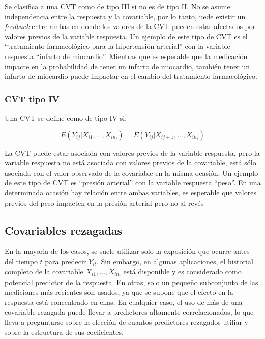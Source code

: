 \documentclass[spanish]{article}
\numberwithin{figure}{subsection}
\numberwithin{equation}{subsection}
\numberwithin{table}{subsection}
\def\xseqn{$X_{i1}, ..., X_{in_i}$}
\begin{document}
Se clasifica a una CVT como de tipo III si no es de tipo II. No se asume independencia entre la respuesta y la covariable,
por lo tanto, uede existir un \textit{feedback} entre ambas en donde los valores de la CVT pueden estar afectados por
valores previos de la variable respuesta. Un ejemplo de este tipo de CVT es el ``tratamiento farmacológico para la
hipertensión arterial'' con la variable respuesta ``infarto de miocardio''. Mientras que es esperable que la medicación
impacte en la probabilidad de tener un infarto de miocardio, también tener un infarto de miocardio puede impactar
en el cambio del tratamiento farmacológico.

\subsubsection{CVT tipo IV}

Una CVT se define como de tipo IV si:

\begin{equation}
	\label{CVT tipo IV}
	E(Y_{ij}|X_{i1}, ..., X_{in_i}) = E(Y_{ij}|X_{ij+1}, ..., X_{in_i})
\end{equation}

La CVT puede estar asociada con valores previos de la variable respuesta, pero la variable respuesta no está asociada
con valores previos de la covariable, está sólo asociada con el valor observado de la covariable en la misma ocasión.
Un ejemplo de este tipo de CVT es ``presión arterial'' con la variable respuesta ``peso''. En una determinada ocasión hay
relación entre ambas variables, es esperable que valores previos del peso impacten en la presión arterial pero no al revés

\subsection{Covariables rezagadas}

En la mayoria de los casos, se suele utilizar solo la exposición que ocurre antes del tiempo $t$ para predecir $Y_{it}$.
Sin embargo, en algunas aplicaciones, el historial completo de la covariable \xseqn{} está disponible y es considerado como
potencial predictor de la respuesta. En otras, solo un pequeño subconjunto de las mediciones más recientes son usados,
ya que se supone que el efecto en la respuesta está concentrado en ellas. En cualquier caso, el uso de más de una covariable
rezagada puede llevar a predictores altamente correlacionados, lo que lleva a preguntarse sobre la elección de cuantos
predictores rezagados utiliar y sobre la estructura de sus coeficientes.
\end{document}
